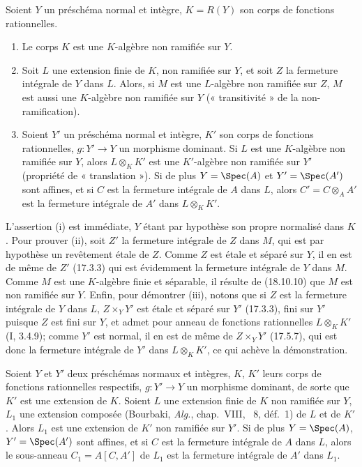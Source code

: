 \begin{proposition}[18.10.13]
\label{IV.18.10.13}
Soient $Y$ un préschéma normal et intègre, $K=R(Y)$ son corps de fonctions rationnelles.
\begin{enumerate}
  \item[(i)] Le corps $K$ est une $K$-algèbre non ramifiée sur $Y$.
  \item[(ii)] Soit $L$ une extension finie de $K$, non ramifiée sur $Y$, et soit $Z$ la fermeture intégrale de $Y$ dans $L$. Alors, si $M$ est une $L$-algèbre non ramifiée sur $Z$, $M$ est aussi une $K$-algèbre non ramifiée sur $Y$ (« transitivité » de la non-ramification).
  \item[(iii)] Soient $Y'$ un préschéma normal et intègre, $K'$ son corps de fonctions rationnelles, $g:Y'\to Y$ un morphisme dominant. Si $L$ est une $K$-algèbre non ramifiée sur $Y$, alors $L\otimes_K K'$ est une $K'$-algèbre non ramifiée sur $Y'$ (propriété de « translation »). Si de plus $Y=\Spec(A)$ et $Y'=\Spec(A')$ sont affines, et si $C$ est la fermeture intégrale de $A$ dans $L$, alors $C'=C\otimes_A A'$ est la fermeture intégrale de $A'$ dans $L\otimes_K K'$.
\end{enumerate}
\end{proposition}

L'assertion (i) est immédiate, $Y$ étant par hypothèse son propre normalisé dans $K$. Pour prouver (ii), soit $Z'$ la fermeture intégrale de $Z$ dans $M$, qui est par hypothèse un revêtement étale de $Z$. Comme $Z$ est étale et séparé sur $Y$, il en est de même de $Z'$ (17.3.3) qui est évidemment la fermeture intégrale de $Y$ dans $M$. Comme $M$ est une $K$-algèbre finie et séparable, il résulte de (18.10.10) que $M$ est non ramifiée sur $Y$. Enfin, pour démontrer (iii), notons que si $Z$ est la fermeture intégrale de $Y$ dans $L$, $Z\times_Y Y'$ est étale et séparé sur $Y'$ (17.3.3), fini sur $Y'$ puisque $Z$ est fini sur $Y$, et admet pour anneau de fonctions rationnelles $L\otimes_K K'$ (I, 3.4.9); comme $Y'$ est normal, il en est de même de $Z\times_Y Y'$ (17.5.7), qui est donc la fermeture intégrale de $Y'$ dans $L\otimes_K K'$, ce qui achève la démonstration.

\begin{corollary}[18.10.14]
\label{IV.18.10.14}
Soient $Y$ et $Y'$ deux préschémas normaux et intègres, $K$, $K'$ leurs corps de fonctions rationnelles respectifs, $g:Y'\to Y$ un morphisme dominant, de sorte que $K'$ est une extension de $K$. Soient $L$ une extension finie de $K$ non ramifiée sur $Y$, $L_1$ une extension composée (Bourbaki, \emph{Alg.}, chap.~VIII, \textsection~8, déf.~1) de $L$ et de $K'$. Alors $L_1$ est une extension de $K'$ non ramifiée sur $Y'$. Si de plus $Y=\Spec(A)$, $Y'=\Spec(A')$ sont affines, et si $C$ est la fermeture intégrale de $A$ dans $L$, alors le sous-anneau $C_1=A[C,A']$ de $L_1$ est la fermeture intégrale de $A'$ dans $L_1$.
\end{corollary}

